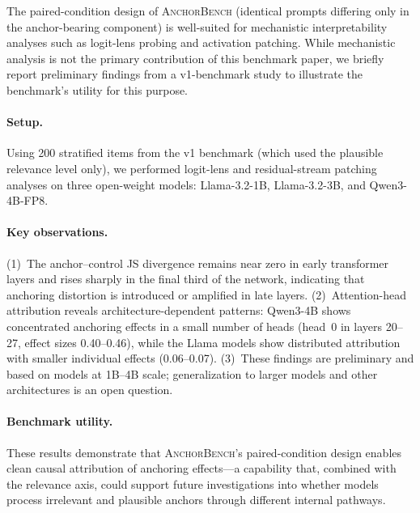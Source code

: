 The paired-condition design of \textsc{AnchorBench} (identical
prompts differing only in the anchor-bearing component) is
well-suited for mechanistic interpretability analyses such as
logit-lens probing and activation patching.
While mechanistic analysis is not the primary contribution of
this benchmark paper, we briefly report preliminary findings
from a v1-benchmark study to illustrate the benchmark's
utility for this purpose.

\paragraph{Setup.}
Using 200 stratified items from the v1 benchmark (which used
the plausible relevance level only), we performed logit-lens
and residual-stream patching analyses on three open-weight
models: Llama-3.2-1B, Llama-3.2-3B, and Qwen3-4B-FP8.

\paragraph{Key observations.}
(1)~The anchor--control JS divergence remains near zero in
early transformer layers and rises sharply in the final third
of the network, indicating that anchoring distortion is
introduced or amplified in late layers.
(2)~Attention-head attribution reveals architecture-dependent
patterns: Qwen3-4B shows concentrated anchoring effects in a
small number of heads (head~0 in layers 20--27, effect sizes
0.40--0.46), while the Llama models show distributed
attribution with smaller individual effects (0.06--0.07).
(3)~These findings are preliminary and based on models at
1B--4B scale; generalization to larger models and other
architectures is an open question.

\paragraph{Benchmark utility.}
These results demonstrate that \textsc{AnchorBench}'s
paired-condition design enables clean causal attribution of
anchoring effects---a capability that, combined with the
relevance axis, could support future investigations into
whether models process irrelevant and plausible anchors through
different internal pathways.

